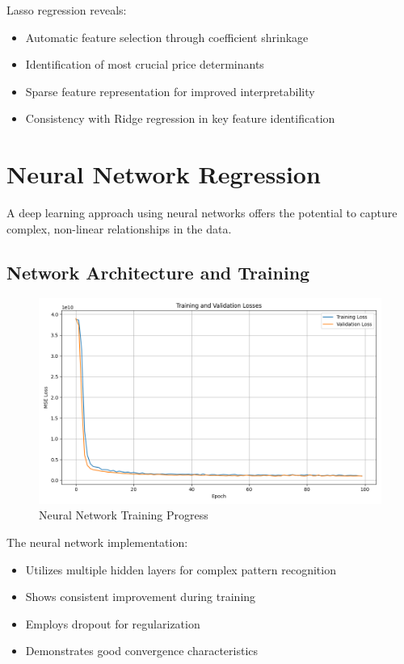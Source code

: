 \documentclass[12pt]{report}
\begin{document}
Lasso regression reveals:
\begin{itemize}
    \item Automatic feature selection through coefficient shrinkage
    \item Identification of most crucial price determinants
    \item Sparse feature representation for improved interpretability
    \item Consistency with Ridge regression in key feature identification
\end{itemize}

\section{Neural Network Regression}
A deep learning approach using neural networks offers the potential to capture complex, non-linear relationships in the data.

\subsection{Network Architecture and Training}
\begin{figure}[H]
    \centering
    \includegraphics[width=1.0\textwidth]{figures/neural_network_training.png}
    \caption{Neural Network Training Progress}
    \label{fig:nn_training}
\end{figure}

The neural network implementation:
\begin{itemize}
    \item Utilizes multiple hidden layers for complex pattern recognition
    \item Shows consistent improvement during training
    \item Employs dropout for regularization
    \item Demonstrates good convergence characteristics
\end{itemize}
\end{document}
